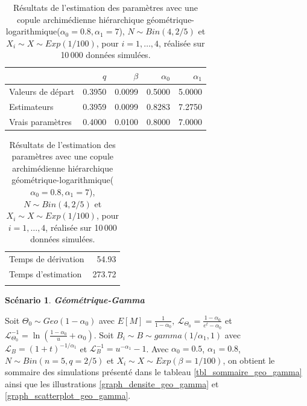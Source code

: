 \documentclass{article}
\newtheorem{Scenario}{Scénario}
\begin{document}
	\begin{table}[H]
		\centering
		\begin{tabular}{lrrrr}
			\hline
			& $q$ & $\beta$ & $\alpha_0$ & $\alpha_1$ \\ 
			\hline
			Valeurs de départ & 0.3950 & 0.0099 & 0.5000 & 5.0000 \\ 
			Estimateurs & 0.3959 & 0.0099 & 0.8283 & 7.2750 \\ 
			Vrais paramètres & 0.4000 & 0.0100 & 0.8000 & 7.0000 \\ 
			\hline
		\end{tabular}
		\begin{tabular}{lr}
			\hline
			&  \\ 
			\hline
			Temps de dérivation & 54.93 \\ 
			Temps d'estimation & 273.72 \\ 
			\\
			\hline
		\end{tabular}
		\caption[Résultats du scénario \ref{scenario_geo_log}]{Résultats de l'estimation des paramètres avec une copule archimédienne hiérarchique géométrique-logarithmique($\alpha_0=0.8, \alpha_1 = 7$), $N \sim Bin(4, 2/5)$ et $X_i \sim X \sim Exp(1/100)$, pour $i=1,\dots,4$, réalisée sur 10\,000 données simulées.}
		\label{tbl_resultats_geo_log}
	\end{table}



	\begin{Scenario}\label{scenario_geo_gamma}
		\textbf{Géométrique-Gamma}
	\end{Scenario}
	
	Soit $\Theta_0 \sim Geo(1-\alpha_0)$ avec $E[M] = \frac{1}{1-\alpha_0},\ \mathscr{L}_{\Theta_0} = \frac{1-\alpha_0}{e^t-\alpha_0}$ et $\mathscr{L}^{-1}_{\Theta_0} = \ln\left(\frac{1 - \alpha_0}{u}+\alpha_0\right)$.
	Soit $B_i \sim B \sim gamma(1/\alpha_1,1)$ avec $\mathscr{L}_{B} = (1+t)^{-1/\alpha_1}$ et $\mathscr{L}^{-1}_{B} = u^{-\alpha_1} - 1$. Avec $\alpha_0 = 0.5$, $\alpha_1 = 0.8$, $N\sim Bin(n=5, q=2/5)$ et $X_i \sim X \sim Exp(\beta = 1/100)$, on obtient le sommaire des simulations présenté dans le tableau \ref{tbl_sommaire_geo_gamma} ainsi que les illustrations \ref{graph_densite_geo_gamma} et \ref{graph_scatterplot_geo_gamma}.
	
\end{document}
